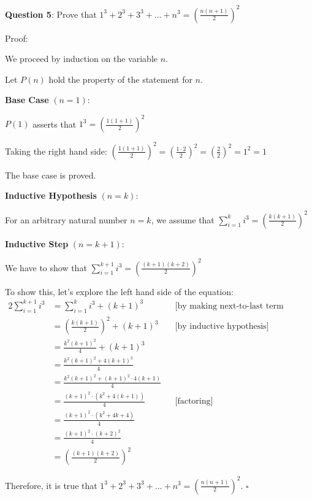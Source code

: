 \documentclass{article} %
\newcommand{\question}[2][]{\begin{flushleft}
        \textbf{Question #1}: #2

\end{flushleft}}
\begin{document}
    \question[5]{Prove that $1^3 + 2^3 + 3^3 + ... + n^3 = (\frac{n(n+1)}{2})^2$}

    Proof:

    We proceed by induction on the variable $n$.

    Let $P(n)$ hold the property of the statement for $n$.

    \textbf{Base Case} $(n = 1)$:

    $P(1)$ asserts that $1^3 = (\frac{1(1+1)}{2})^2$

    Taking the right hand side: $(\frac{1(1+1)}{2})^2  = (\frac{1 \cdot 2}{2})^2 = (\frac{2}{2})^2 = 1^2 = 1$

    The base case is proved.

    \textbf{Inductive Hypothesis} $(n = k)$:

    For an arbitrary natural number $n = k$, we assume that $\sum_{i = 1}^k i^3 = (\frac{k(k+1)}{2})^2$

    \textbf{Inductive Step} $(n = k + 1)$:

    We have to show that $\sum_{i = 1}^{k + 1} i^3 = (\frac{(k + 1)(k + 2)}{2})^2$

    To show this, let's explore the left hand side of the equation:
    \begin{alignat*}{2}
        \sum_{i = 1}^{k + 1} i^3 &= \sum_{i = 1}^{k} i^3 + (k + 1)^3 &&\text{[by making next-to-last term explicit]}\\
        &= \left(\frac{k(k+1)}{2}\right)^2 + (k + 1)^3 &&\text{[by inductive hypothesis]}\\
        &= \frac{k^2(k+1)^2}{4} + (k + 1)^3\\
        &= \frac{k^2(k+1)^2+ 4(k + 1)^3}{4}\\
        &= \frac{k^2(k+1)^2+ (k + 1)^2 \cdot 4(k + 1)}{4}\\
        &= \frac{(k + 1)^2 \cdot (k^2 + 4(k + 1))}{4} &&\text{[factoring]}\\
        &= \frac{(k + 1)^2 \cdot (k^2 + 4k + 4)}{4}\\
        &= \frac{(k + 1)^2 \cdot (k + 2)^2}{4}\\
        &= \left(\frac{(k + 1)(k+2)}{2}\right) ^2
    \end{alignat*}

    Therefore, it is true that $1^3 + 2^3 + 3^3 + ... + n^3 = (\frac{n(n+1)}{2})^2$. $\square$

    \newpage

                                                                           
\end{document}
